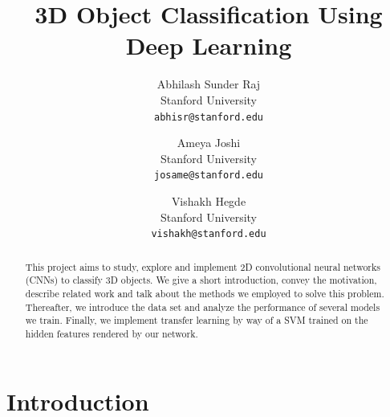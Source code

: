 \documentclass[10pt,twocolumn,letterpaper]{article}
\begin{document}
\title{3D Object Classification Using Deep Learning}

\author{Abhilash Sunder Raj\\
Stanford University\\
{\tt\small abhisr@stanford.edu}
\and
Ameya Joshi\\
Stanford University\\
{\tt\small josame@stanford.edu}
\and
Vishakh Hegde\\
Stanford University\\
{\tt\small vishakh@stanford.edu}
}


\maketitle

\begin{abstract}
This project aims to study, explore and implement 2D convolutional neural networks (CNNs) to classify 3D objects. We give a short introduction, convey the motivation, describe related work and talk about the methods we employed to solve this problem. Thereafter, we introduce the data set and analyze the performance of several models we train. Finally, we implement transfer learning by way of a SVM trained on the hidden features rendered by our network. 
\end{abstract}

\section{Introduction}
\end{document}
